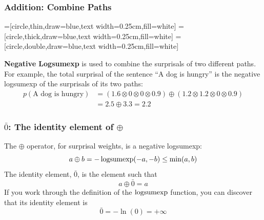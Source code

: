\documentclass{beamer}
\newcommand{\logsumexp}{\operatornamewithlimits{logsumexp}}
\begin{document}
\begin{frame}
  \frametitle{Addition: Combine Paths}
  \begin{center}
    =[circle,thin,draw=blue,text width=0.25cm,fill=white]
    =[circle,thick,draw=blue,text width=0.25cm,fill=white]
    =[circle,double,draw=blue,text width=0.25cm,fill=white]    
  \end{center}
  
  {\bf Negative Logsumexp} is used to combine the surprisals of two different
  paths.  For example, the total surprisal of the sentence ``A dog
  is hungry'' is the negative logsumexp of the surprisals of its two paths:
  \begin{align*}
    p(\mbox{A dog is hungry}) &= \left(1.6\otimes 0\otimes 0\otimes 0.9\right)\oplus\left(1.2\otimes 1.2\otimes 0\otimes 0.9\right)\\
    &=2.5\oplus 3.3 = 2.2
  \end{align*}
\end{frame}

\begin{frame}
  \frametitle{$\bar{0}$: The identity element of $\oplus$}

  The $\oplus$ operator, for surprisal weights, is a negative
  logsumexp:
  \begin{displaymath}
    a\oplus b = -\logsumexp(-a,-b) \le \min(a,b)
  \end{displaymath}
  The identity element, $\bar{0}$, is the element such that
  \begin{displaymath}
    a\oplus \bar{0} = a
  \end{displaymath}
  If you work through the definition of the $\logsumexp$ function, you
  can discover that its identity element is
  \begin{displaymath}
    \bar{0} = -\ln(0)  = +\infty
  \end{displaymath}
\end{frame}
\end{document}
